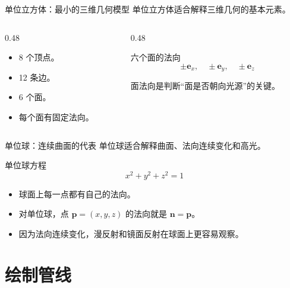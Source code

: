 \documentclass[aspectratio=169,11pt]{ctexbeamer}
\begin{document}
\begin{frame}{单位立方体：最小的三维几何模型}
  单位立方体适合解释三维几何的基本元素。

  \begin{columns}
    \begin{column}{0.48\linewidth}
      \begin{itemize}
        \item 8 个顶点。
        \item 12 条边。
        \item 6 个面。
        \item 每个面有固定法向。
      \end{itemize}
    \end{column}
    \begin{column}{0.48\linewidth}
      \begin{block}{六个面的法向}
        \[
        \pm\mathbf e_x,\quad
        \pm\mathbf e_y,\quad
        \pm\mathbf e_z
        \]
      \end{block}
      面法向是判断“面是否朝向光源”的关键。
    \end{column}
  \end{columns}
\end{frame}

\begin{frame}{单位球：连续曲面的代表}
  单位球适合解释曲面、法向连续变化和高光。

  \begin{block}{单位球方程}
    \[
    x^2+y^2+z^2=1
    \]
  \end{block}

  \begin{itemize}
    \item 球面上每一点都有自己的法向。
    \item 对单位球，点 \(\mathbf p=(x,y,z)\) 的法向就是 \(\mathbf n=\mathbf p\)。
    \item 因为法向连续变化，漫反射和镜面反射在球面上更容易观察。
  \end{itemize}
\end{frame}

\section{绘制管线}
\end{document}
